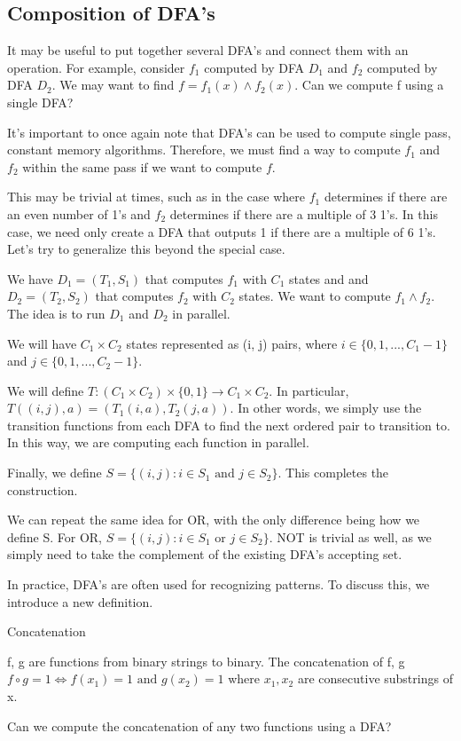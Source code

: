 \hr

\subsection*{Composition of DFA's}
It may be useful to put together several DFA's and connect them with an operation. For example, consider $f_1$ computed by DFA $D_1$ and $f_2$ computed by DFA $D_2$. We may want to find $f = f_1(x) \land f_2(x)$. Can we compute f using a single DFA?

It's important to once again note that DFA's can  be used to compute single pass, constant memory algorithms. Therefore, we must find a way to compute $f_1$ and $f_2$ within the same pass if we want to compute $f$.

This may be trivial at times, such as in the case where $f_1$ determines if there are an even number of 1's and $f_2$ determines if there are a multiple of 3 1's. In this case, we need only create a DFA that outputs 1 if there are a multiple of 6 1's. Let's try to generalize this beyond the special case.

{
    We have $D_1 = (T_1, S_1)$ that computes $f_1$ with $C_1$ states and and $D_2 = (T_2, S_2)$ that computes $f_2$ with $C_2$ states. We want to compute $f_1 \land f_2$. The idea is to run $D_1$ and $D_2$ in parallel.

    We will have $C_1 \times C_2$ states represented as (i, j) pairs, where $i \in \{0, 1, ..., C_1 - 1\}$ and $j \in \{0, 1, ..., C_2 - 1\}.$

    We will define $T: (C_1 \times C_2) \times \{0,1\} \rightarrow C_1 \times C_2$. In particular, $T((i, j), a) = (T_1(i, a), T_2(j, a)).$ In other words, we simply use the transition functions from each DFA to find the next ordered pair to transition to. In this way, we are computing each function in parallel.

    Finally, we define $S = \{(i, j): i \in S_1 \text{ and } j \in S_2\}$. This completes the construction. 
}

We can repeat the same idea for OR, with the only difference being how we define S. For OR, $S = \{(i, j): i \in S_1 \text{ or } j \in S_2\}$. NOT is trivial as well, as we simply need to take the complement of the existing DFA's accepting set. 

\hr 

In practice, DFA's are often used for recognizing patterns. To discuss this, we introduce a new definition.

\begin{definition}
    Concatenation

    f, g are functions from binary strings to binary. The concatenation of f, g $f \circ g = 1 \iff f(x_1) = 1 \text{ and } g(x_2) = 1$ where $x_1, x_2$ are consecutive substrings of x.
\end{definition}

Can we compute the concatenation of any two functions using a DFA?

    